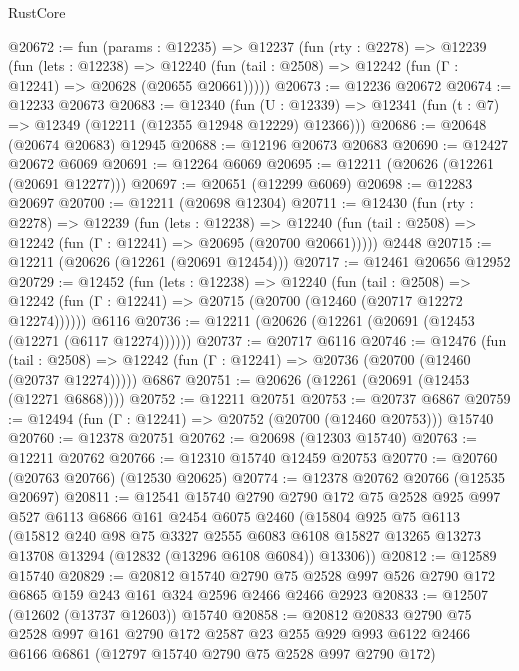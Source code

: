 \begin{lexlean}{RustCore}
\begin{coremodule}
@20672 := fun (params : @12235) =>
  @12237
    (fun (rty : @2278) =>
    @12239
      (fun (lets : @12238) =>
      @12240 (fun (tail : @2508) => @12242 (fun (Γ : @12241) => @20628 (@20655 @20661)))))
@20673 := @12236 @20672
@20674 := @12233 @20673
@20683 := @12340
    (fun (U : @12339) => @12341 (fun (t : @7) => @12349 (@12211 (@12355 @12948 @12229) @12366)))
@20686 := @20648 (@20674 @20683) @12945
@20688 := @12196 @20673 @20683
@20690 := @12427 @20672 @6069
@20691 := @12264 @6069
@20695 := @12211 (@20626 (@12261 (@20691 @12277)))
@20697 := @20651 (@12299 @6069)
@20698 := @12283 @20697
@20700 := @12211 (@20698 @12304)
@20711 := @12430
    (fun (rty : @2278) =>
    @12239
      (fun (lets : @12238) =>
      @12240 (fun (tail : @2508) => @12242 (fun (Γ : @12241) => @20695 (@20700 @20661)))))
    @2448
@20715 := @12211 (@20626 (@12261 (@20691 @12454)))
@20717 := @12461 @20656 @12952
@20729 := @12452
    (fun (lets : @12238) =>
    @12240
      (fun (tail : @2508) =>
      @12242 (fun (Γ : @12241) => @20715 (@20700 (@12460 (@20717 @12272 @12274))))))
    @6116
@20736 := @12211 (@20626 (@12261 (@20691 (@12453 (@12271 (@6117 @12274))))))
@20737 := @20717 @6116
@20746 := @12476
    (fun (tail : @2508) => @12242 (fun (Γ : @12241) => @20736 (@20700 (@12460 (@20737 @12274)))))
    @6867
@20751 := @20626 (@12261 (@20691 (@12453 (@12271 @6868))))
@20752 := @12211 @20751
@20753 := @20737 @6867
@20759 := @12494 (fun (Γ : @12241) => @20752 (@20700 (@12460 @20753))) @15740
@20760 := @12378 @20751
@20762 := @20698 (@12303 @15740)
@20763 := @12211 @20762
@20766 := @12310 @15740 @12459 @20753
@20770 := @20760 (@20763 @20766) (@12530 @20625)
@20774 := @12378 @20762 @20766 (@12535 @20697)
@20811 := @12541
    @15740
    @2790
    @2790
    @172
    @75
    @2528
    @925
    @997
    @527
    @6113
    @6866
    @161
    @2454
    @6075
    @2460
    (@15804
      @925
      @75
      @6113
      (@15812
        @240
        @98
        @75
        @3327
        @2555
        @6083
        @6108
        @15827
        @13265
        @13273
        @13708
        @13294
        (@12832 (@13296 @6108 @6084))
        @13306))
@20812 := @12589 @15740
@20829 := @20812
    @15740
    @2790
    @75
    @2528
    @997
    @526
    @2790
    @172
    @6865
    @159
    @243
    @161
    @324
    @2596
    @2466
    @2466
    @2923
@20833 := @12507 (@12602 (@13737 @12603)) @15740
@20858 := @20812
    @20833
    @2790
    @75
    @2528
    @997
    @161
    @2790
    @172
    @2587
    @23
    @255
    @929
    @993
    @6122
    @2466
    @6166
    @6861
    (@12797 @15740 @2790 @75 @2528 @997 @2790 @172)

\end{coremodule}
\end{lexlean}
